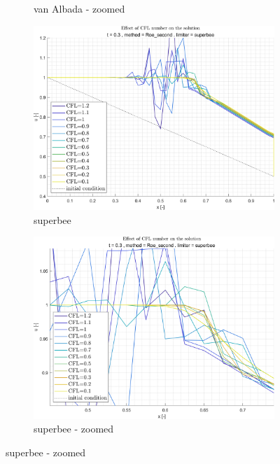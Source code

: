 \documentclass[11pt, a4paper]{article}
\begin{document}
\begin{figure}[H]
\begin{subfigure}[c]{.35\textwidth}
        \caption{van Albada - zoomed}
        \label{fig:roe_second_van_Albada_B}
    \end{subfigure}
    \begin{subfigure}[c]{.35\textwidth}
        \centering
        \includegraphics[width=\textwidth]{images/grap4.png}
        \caption{superbee}
        \label{fig:roe_second_superbee_A}
    \end{subfigure}
    \begin{subfigure}[c]{.35\textwidth}
        \centering
        \includegraphics[width=\textwidth]{images/grap4.1.png}
        \caption{superbee - zoomed}
        \label{fig:roe_second_superbee_B}
    \end{subfigure}

\end{figure}
\end{document}
